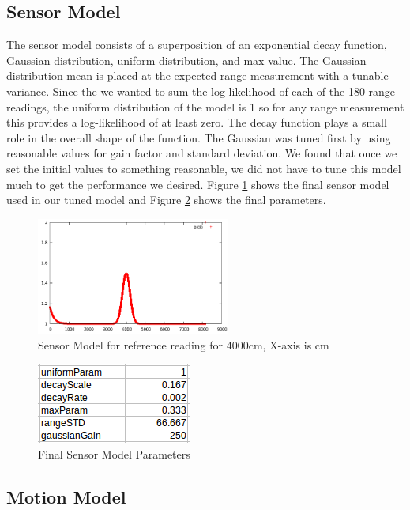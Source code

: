 \documentclass{article}
\begin{document}
\subsection{Sensor Model}
	The sensor model consists of a superposition of an exponential decay function, Gaussian distribution, uniform distribution, and max value.  The Gaussian distribution mean is placed at the expected range measurement with a tunable variance. Since the we wanted to sum the log-likelihood of each of the 180 range readings, the uniform distribution of the model is 1 so for any range measurement this provides a log-likelihood of at least zero. The decay function plays a small role in the overall shape of the function. The Gaussian was tuned first by using reasonable values for gain factor and standard deviation.  We found that once we set the initial values to something reasonable, we did not have to tune this model much to get the performance we desired. Figure \ref{fig:2} shows the final sensor model used in our tuned model and Figure \ref{fig:3} shows the final parameters.
\begin{figure}[!h]
    \centering
    \includegraphics[width=2.5in]{media/sensor_model.png}
    \caption{Sensor Model for reference reading for 4000cm, X-axis is cm}
\label{fig:2}
\end{figure}

\begin{figure}[!h]
    \centering
    \includegraphics[width=2.0in]{media/sensor_model_parameters.png}
    \caption{Final Sensor Model Parameters}
\label{fig:3}
\end{figure}

\subsection{Motion Model}
\end{document}
